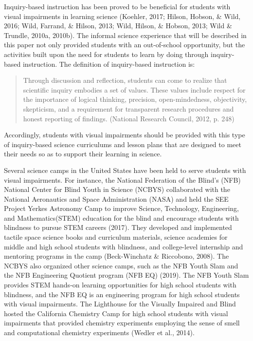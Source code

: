 \documentclass[11.5pt]{sig-alternate} %
\begin{document}
\begin{large}
Inquiry-based instruction has been proved to be beneficial for students with visual impairments in learning science (Koehler, 2017; Hilson, Hobson, \& Wild, 2016; Wild, Farrand, \& Hilson, 2013; Wild, Hilson, \& Hobson, 2013; Wild \& Trundle, 2010a, 2010b). The informal science experience that will be described in this paper not only provided students with an out-of-school opportunity, but the activities built upon the need for students to learn by doing through inquiry-based instruction. The definition of inquiry-based instruction is:

\begin{quote}
    Through discussion and reflection, students can come to realize that scientific inquiry embodies a set of values. These values include respect for the importance of logical thinking, precision, open-mindedness, objectivity, skepticism, and a requirement for transparent research procedures and honest reporting of findings. (National Research Council, 2012, p. 248)
\end{quote}

Accordingly, students with visual impairments should be provided with this type of inquiry-based science curriculums and lesson plans that are designed to meet their needs so as to support their learning in science.

Several science camps in the United States have been held to serve students with visual impairments. For instance, the National Federation of the Blind’s (NFB) National Center for Blind Youth in Science (NCBYS) collaborated with the National Aeronautics and Space Administration (NASA) and held the SEE Project Yerkes Astronomy Camp to improve Science, Technology, Engineering, and Mathematics(STEM) education for the blind and encourage students with blindness to pursue STEM careers (2017). They developed and implemented tactile space science books and curriculum materials, science academies for middle and high school students with blindness, and college-level internship and mentoring programs in the camp (Beck-Winchatz \& Riccobono, 2008). The NCBYS also organized other science camps, such as the NFB Youth Slam and the NFB Engineering Quotient program (NFB EQ) (2019). The NFB Youth Slam provides STEM hands-on learning opportunities for high school students with blindness, and the NFB EQ is an engineering program for high school students with visual impairments. The Lighthouse for the Visually Impaired and Blind hosted the California Chemistry Camp for high school students with visual impairments that provided chemistry experiments employing the sense of smell and computational chemistry experiments (Wedler et al., 2014).


\end{large}
\end{document}
